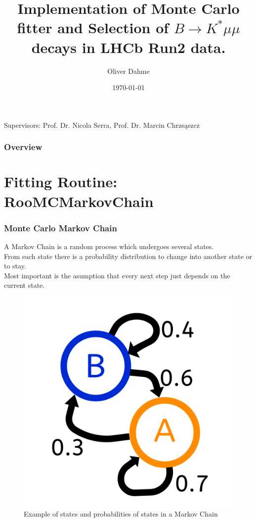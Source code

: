\documentclass{beamer}
\title[Master Thesis]{Implementation of Monte Carlo fitter and Selection of $B \rightarrow K^* \mu \mu$ decays in LHCb Run2 data.} %
\author{Oliver Dahme} %
\institute[UZH] %
{
University of Zurich \\ %
\medskip
\textit{o.dahme@cern.ch} %
}
\date{\today} %
\begin{document}
\begin{frame}
 \titlepage %
 \centering Supervisors: Prof. Dr. Nicola Serra, Prof. Dr. Marcin Chrzs\k{a}szcz
\end{frame}

\begin{frame}
 \frametitle{Overview} %
 \tableofcontents %
\end{frame}



\section{Fitting Routine: RooMCMarkovChain}


\begin{frame}
 \frametitle{Monte Carlo Markov Chain}
 A Markov Chain is a random process which undergoes several states. \\
 From each state there is a probability distribution to change into another state or to stay. \\
 Most important is the asumption that every next step just depends on the current state.
 \begin{figure}
  \includegraphics[width=0.3\linewidth]{figures/MCMC_Chain}
  \caption{Example of states and probabilities of states in a Markov Chain}
 \end{figure}
\end{frame}
\end{document}
